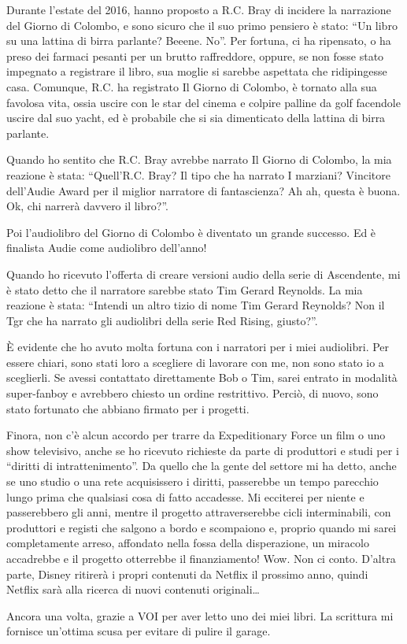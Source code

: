 Durante l'estate del 2016, hanno proposto a R.C. Bray di incidere la
narrazione del Giorno di Colombo, e sono sicuro che il suo primo
pensiero è stato: ``Un libro su una lattina di birra parlante? Beeene.
No''. Per fortuna, ci ha ripensato, o ha preso dei farmaci pesanti per
un brutto raffreddore, oppure, se non fosse stato impegnato a registrare
il libro, sua moglie si sarebbe aspettata che ridipingesse casa.
Comunque, R.C. ha registrato Il Giorno di Colombo, è tornato alla sua
favolosa vita, ossia uscire con le star del cinema e colpire palline da
golf facendole uscire dal suo yacht, ed è probabile che si sia
dimenticato della lattina di birra parlante.

Quando ho sentito che R.C. Bray avrebbe narrato Il Giorno di Colombo, la
mia reazione è stata: ``Quell'R.C. Bray? Il tipo che ha narrato I
marziani? Vincitore dell'Audie Award per il miglior narratore di
fantascienza? Ah ah, questa è buona. Ok, chi narrerà davvero il
libro?''.

Poi l'audiolibro del Giorno di Colombo è diventato un grande successo.
Ed è finalista Audie come audiolibro dell'anno!

Quando ho ricevuto l'offerta di creare versioni audio della serie di
Ascendente, mi è stato detto che il narratore sarebbe stato Tim Gerard
Reynolds. La mia reazione è stata: ``Intendi un altro tizio di nome Tim
Gerard Reynolds? Non il Tgr che ha narrato gli audiolibri della serie
Red Rising, giusto?''.

È evidente che ho avuto molta fortuna con i narratori per i miei
audiolibri. Per essere chiari, sono stati loro a scegliere di lavorare
con me, non sono stato io a sceglierli. Se avessi contattato
direttamente Bob o Tim, sarei entrato in modalità super-fanboy e
avrebbero chiesto un ordine restrittivo. Perciò, di nuovo, sono stato
fortunato che abbiano firmato per i progetti.

Finora, non c'è alcun accordo per trarre da Expeditionary Force un film
o uno show televisivo, anche se ho ricevuto richieste da parte di
produttori e studi per i ``diritti di intrattenimento''. Da quello che
la gente del settore mi ha detto, anche se uno studio o una rete
acquisissero i diritti, passerebbe un tempo parecchio lungo prima che
qualsiasi cosa di fatto accadesse. Mi ecciterei per niente e
passerebbero gli anni, mentre il progetto attraverserebbe cicli
interminabili, con produttori e registi che salgono a bordo e scompaiono
e, proprio quando mi sarei completamente arreso, affondato nella fossa
della disperazione, un miracolo accadrebbe e il progetto otterrebbe il
finanziamento! Wow. Non ci conto. D'altra parte, Disney ritirerà i
propri contenuti da Netflix il prossimo anno, quindi Netflix sarà alla
ricerca di nuovi contenuti originali\ldots{}

Ancora una volta, grazie a VOI per aver letto uno dei miei libri. La
scrittura mi fornisce un'ottima scusa per evitare di pulire il garage.